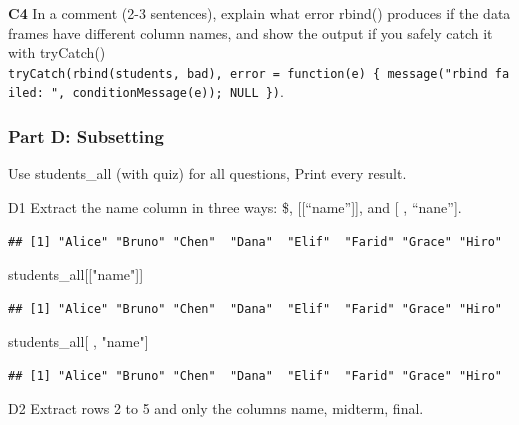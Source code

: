 \documentclass[
]{article}
\newenvironment{Shaded}{\begin{snugshade}}{\end{snugshade}}
\newcommand{\NormalTok}[1]{#1}
\newcommand{\OtherTok}[1]{\textcolor[rgb]{0.56,0.35,0.01}{#1}}
\newcommand{\SpecialCharTok}[1]{\textcolor[rgb]{0.81,0.36,0.00}{\textbf{#1}}}
\newcommand{\StringTok}[1]{\textcolor[rgb]{0.31,0.60,0.02}{#1}}
\begin{document}
\textbf{C4} In a comment (2-3 sentences), explain what error rbind()
produces if the data frames have different column names, and show the
output if you safely catch it with tryCatch()
\texttt{tryCatch(rbind(students,\ bad),\ error\ =\ function(e)\ \{\ message("rbind\ failed:\ ",\ conditionMessage(e));\ NULL\ \})}.

\subsubsection{Part D: Subsetting}\label{part-d-subsetting}

Use students\_all (with quiz) for all questions, Print every result.

D1 Extract the name column in three ways: \$, {[}{[}``name''{]}{]}, and
{[} , ``nane''{]}.

\begin{Shaded}
\end{Shaded}

\begin{verbatim}
## [1] "Alice" "Bruno" "Chen"  "Dana"  "Elif"  "Farid" "Grace" "Hiro"
\end{verbatim}

\begin{Shaded}
\begin{Highlighting}[]
\NormalTok{students\_all[[}\StringTok{"name"}\NormalTok{]]}
\end{Highlighting}
\end{Shaded}

\begin{verbatim}
## [1] "Alice" "Bruno" "Chen"  "Dana"  "Elif"  "Farid" "Grace" "Hiro"
\end{verbatim}

\begin{Shaded}
\begin{Highlighting}[]
\NormalTok{students\_all[ , }\StringTok{"name"}\NormalTok{]}
\end{Highlighting}
\end{Shaded}

\begin{verbatim}
## [1] "Alice" "Bruno" "Chen"  "Dana"  "Elif"  "Farid" "Grace" "Hiro"
\end{verbatim}

D2 Extract rows 2 to 5 and only the columns name, midterm, final.
\end{document}
